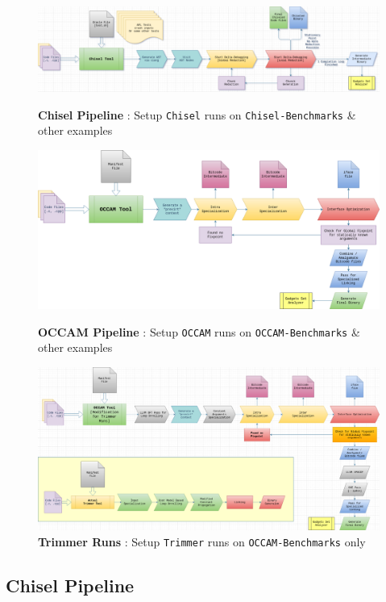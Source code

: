\documentclass{relatorio}
\begin{document}
\onecolumn
\begin{figure}[H]
	\centering
	\captionsetup{justification=centering}
	\includegraphics[width=1\linewidth]{imgs/chisel-pipeline.png}
	\caption{\textbf{Chisel Pipeline} : Setup \texttt{Chisel} runs on \texttt{Chisel-Benchmarks} \& other examples}%
	\label{fig:plant}
	\centering
	\captionsetup{justification=centering}
	\includegraphics[width=1\linewidth]{imgs/occam-pipeline.png}
	\caption{\textbf{OCCAM Pipeline} : Setup \texttt{OCCAM} runs on \texttt{OCCAM-Benchmarks} \& other examples}%
	\label{fig:plant}
	\centering
	\captionsetup{justification=centering}
	\includegraphics[width=1\linewidth]{imgs/occam-modified-trimmer.png}
	\caption{\textbf{Trimmer Runs} : Setup \texttt{Trimmer} runs on \texttt{OCCAM-Benchmarks} only}%
	\label{fig:plant}
\end{figure}
\twocolumn

\subsection{Chisel Pipeline}%
\label{Tools}
\end{document}
